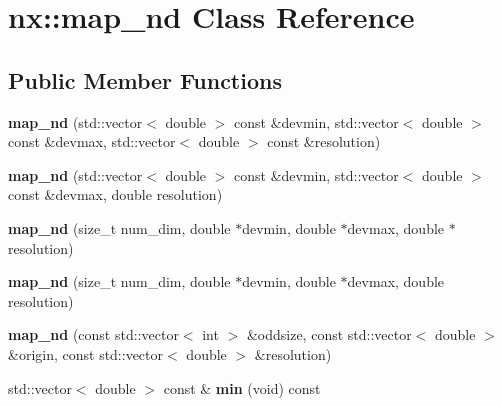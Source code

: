 \hypertarget{classnx_1_1map__nd}{}\section{nx\+:\+:map\+\_\+nd Class Reference}
\label{classnx_1_1map__nd}
\subsection*{Public Member Functions}
\begin{DoxyCompactItemize}
\item 
\mbox{\label{classnx_1_1map__nd_a78f5e0bfb0c62de795de24fa81ce9bdd}} 
{\bfseries map\+\_\+nd} (std\+::vector$<$ double $>$ const \&devmin, std\+::vector$<$ double $>$ const \&devmax, std\+::vector$<$ double $>$ const \&resolution)
\item 
\mbox{\label{classnx_1_1map__nd_aebac1dd3f2bab505be8374ffd61ec00d}} 
{\bfseries map\+\_\+nd} (std\+::vector$<$ double $>$ const \&devmin, std\+::vector$<$ double $>$ const \&devmax, double resolution)
\item 
\mbox{\label{classnx_1_1map__nd_a7d0ac18594ca1e05616455426f8cdca5}} 
{\bfseries map\+\_\+nd} (size\+\_\+t num\+\_\+dim, double $\ast$devmin, double $\ast$devmax, double $\ast$resolution)
\item 
\mbox{\label{classnx_1_1map__nd_a81362efe2df41defa05895a5f0be544f}} 
{\bfseries map\+\_\+nd} (size\+\_\+t num\+\_\+dim, double $\ast$devmin, double $\ast$devmax, double resolution)
\item 
\mbox{\label{classnx_1_1map__nd_a7b6ca0645b4632fe932caed1decf0787}} 
{\bfseries map\+\_\+nd} (const std\+::vector$<$ int $>$ \&oddsize, const std\+::vector$<$ double $>$ \&origin, const std\+::vector$<$ double $>$ \&resolution)
\item 
\mbox{\label{classnx_1_1map__nd_a6e54390d4b7d58686e43b5b4c260c800}} 
std\+::vector$<$ double $>$ const  \& {\bfseries min} (void) const
\item 
\mbox{\label{classnx_1_1map__nd_aff7c7163aebf20b3422f69961ed31323}} 

\end{DoxyCompactItemize}
